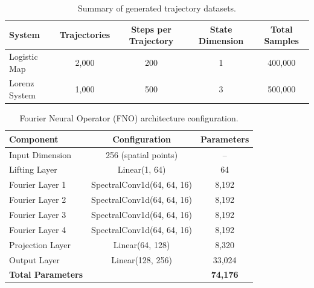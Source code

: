 
\begin{table}[htbp]
\centering
\caption{Summary of generated trajectory datasets.}
\label{tab:datasets}
\begin{tabular}{lcccc}
\toprule
System & Trajectories & Steps per Trajectory & State Dimension & Total Samples \\
\midrule
Logistic Map & 2,000 & 200 & 1 & 400,000 \\
Lorenz System & 1,000 & 500 & 3 & 500,000 \\
\bottomrule
\end{tabular}
\end{table}

\begin{table}[htbp]
\centering
\caption{Fourier Neural Operator (FNO) architecture configuration.}
\label{tab:fno_architecture}
\begin{tabular}{lcc}
\toprule
Component & Configuration & Parameters \\
\midrule
Input Dimension & 256 (spatial points) & -- \\
Lifting Layer & Linear(1, 64) & 64 \\
Fourier Layer 1 & SpectralConv1d(64, 64, 16) & 8,192 \\
Fourier Layer 2 & SpectralConv1d(64, 64, 16) & 8,192 \\
Fourier Layer 3 & SpectralConv1d(64, 64, 16) & 8,192 \\
Fourier Layer 4 & SpectralConv1d(64, 64, 16) & 8,192 \\
Projection Layer & Linear(64, 128) & 8,320 \\
Output Layer & Linear(128, 256) & 33,024 \\
\midrule
\textbf{Total Parameters} & & \textbf{74,176} \\
\bottomrule
\end{tabular}
\end{table}

